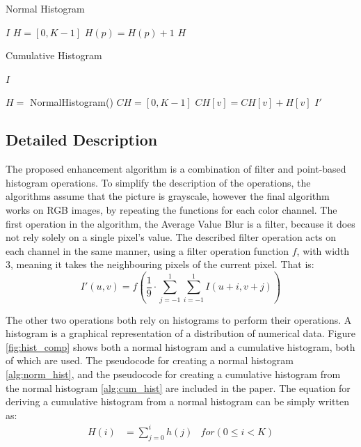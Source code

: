 \documentclass[journal,transmag]{IEEEtran}
\begin{document}
\begin{algorithm}[b!] %
	\caption{Normal Histogram}
	\label{alg:norm_hist}
	\begin{algorithmic}[1]
		 {$I$} 
		\State $H = [0, K-1]$
		\State 
		\State $H(p) = H(p) + 1$
		\EndFor
		\State 
		\State
		\Return $H$
		\EndFunction
	\end{algorithmic}
\end{algorithm}
\begin{algorithm}[tp!]%
	\caption{Cumulative Histogram}
	\label{alg:cum_hist}
	\begin{algorithmic}[1]
		 {$I$} 

		\State $H = $ NormalHistogram()
		\State $CH = [0, K-1]$
		\State
		\State $CH[v] = CH[v] + H[v]$
		\EndFor
		\State 
		\State
		\Return $I'$
		\EndFunction
	\end{algorithmic}
\end{algorithm}

\subsection{Detailed Description}

The proposed enhancement algorithm is a combination of filter and point-based histogram operations. To simplify the description of the operations, the algorithms assume that the picture is grayscale, however the final algorithm works on RGB images, by repeating the functions for each color channel. 
The first operation in the algorithm, the Average Value Blur is a filter, because it does not rely solely on a single pixel's value. The described filter operation acts on each channel in the same manner, using a filter operation function $f$, with width 3, meaning it takes the neighbouring pixels of the current pixel\cite{averageFilter}. That is: 
\begin{equation} %
	I'(u, v) = f(\frac{1}{9}\cdot\sum_{j=-1}^{1}\sum_{i=-1}^{1}I(u+i, v+j))
\end{equation}

The other two operations both rely on histograms to perform their operations. A histogram is a graphical representation of a distribution of numerical data\cite{histDesc}\cite{histDescWiki}. Figure \ref{fig:hist_comp} shows both a normal histogram and a cumulative histogram, both of which are used. The pseudocode for creating a normal histogram \ref{alg:norm_hist}, and the pseudocode for creating a cumulative histogram from the normal histogram \ref{alg:cum_hist} are included in the paper. The equation for deriving a cumulative histogram from a normal histogram can be simply written as: 
\begin{equation}%
\begin{aligned}
H(i) &=  \sum_{j = 0}^{i}h(j) 
& for(0 \leq i < K)
\end{aligned}
\end{equation}
\end{document}
